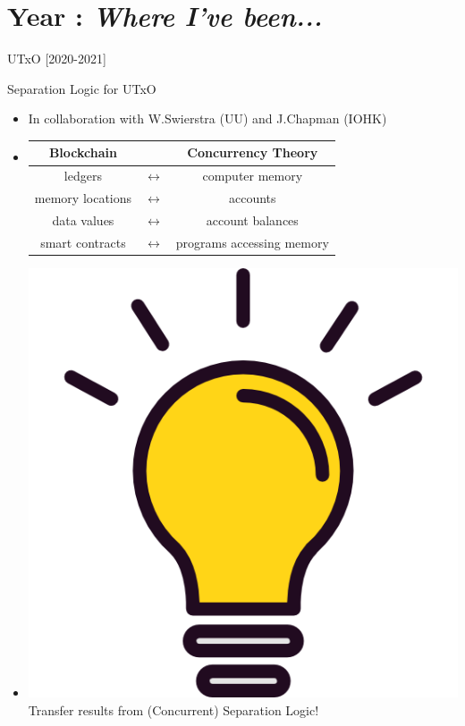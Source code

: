 \documentclass[aspectratio=43]{beamer}
\makeatletter
\newcommand\citeutxoma{%
\textbf{RSC @ ISoLA'20}: \textit{UTxO$_{\textsf{ma}}$: UTxO with Multi-Asset Support}
}
\newcommand\citeeutxoma{%
\textbf{RSC @ ISoLA'20}: \textit{Native Custom Tokens in the Extended UTxO Model}
}
\newcommand\II{\textgoth{II}\xspace}
\makeatother
\begin{document}
\section{Year \II: \textit{Where I've been...}}

\begin{frame}{UTxO [2020-2021]}
\begin{center}
\end{center}
\end{frame}

\newcommand\froto{$\leftrightarrow$}
\begin{frame}{Separation Logic for UTxO}
\begin{itemize}
\item In collaboration with W.Swierstra (UU) and J.Chapman (IOHK)
\pause
\item[]
\begin{tabular}{ccc}
\textbf{Blockchain} & & \textbf{Concurrency Theory} \\
\hline
ledgers &\froto& computer memory \\
memory locations &\froto& accounts \\
data values &\froto& account balances \\
smart contracts &\froto& programs accessing memory \\
\end{tabular}
\pause
\item[] \includegraphics[keepaspectratio=true,height=3ex]{lightbulb}
Transfer results from (Concurrent) Separation Logic!
\end{itemize}
\end{frame}
\end{document}
